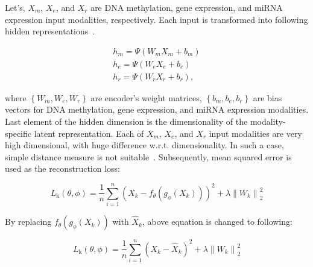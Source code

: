 \hspace*{3.5mm} Let's, $X_m$, $X_e$, and $X_r$ are DNA methylation, gene expression, and miRNA expression input modalities, respectively. Each input is transformed into following hidden representations~\cite{KarimIEEEAccess2019}.

\begin{equation}
    \begin{array}{l}
        {h_{m}=\Psi\left(W_{m} X_{m}+b_{m}\right)} \\
        {h_{e}=\Psi\left(W_{e} X_{e}+b_{e}\right)} \\
        {h_{r}=\Psi\left(W_{r} X_{r}+b_{r}\right),}
    \end{array}
    \label{eq:m1}
\end{equation}  

\hspace*{3.5mm} where $\left\{W_{m}, W_{e}, W_{r}\right\}$ are encoder's weight matrices, $\left\{b_{m}, b_{e}, b_{r}\right\}$ are bias vectors for DNA methylation, gene expression, and miRNA expression modalities. Last element of the hidden dimension is the dimensionality of the modality-specific latent representation. Each of $X_m$, $X_e$, and $X_r$ input modalities are very high dimensional, with huge difference w.r.t. dimensionality. In such a case, simple distance measure is not suitable~\cite{thiam2020multimodal}. Subsequently, mean squared error is used as the reconstruction loss:  

\begin{equation}
    L_{\mathrm{k}}(\theta, \phi)=\frac{1}{n} \sum_{i=1}^{n}\left({X_k}-f_{\theta}\left(g_{\phi}\left({X_k}\right)\right)\right)^{2} +\lambda\left\|W_{k}\right\|_{2}^{2}
\end{equation} 

\hspace*{3.5mm} By replacing $f_{\theta}\left(g_{\phi}\left({X_k}\right)\right)$ with $\hat{X}_{k}$, above equation is changed to following: 

\begin{equation}
    L_{\mathrm{k}}(\theta, \phi)=\frac{1}{n} \sum_{i=1}^{n}\left({X_k}-\hat{X}_{k}\right)^{2} +\lambda\left\|W_{k}\right\|_{2}^{2}
\end{equation} 

